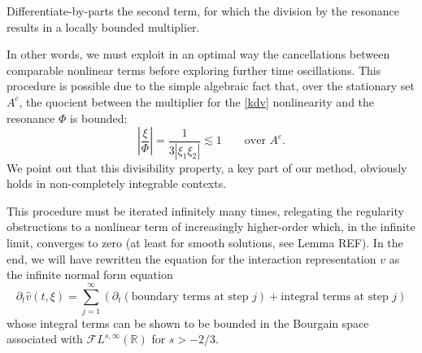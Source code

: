 \documentclass[%
11pt,  reqno]{amsart}
\newcommand{\red}{\color{red}}
\newcommand{\5}{\textup{V}}
\newcommand{\noi}{\noindent}
\newcommand{\dt}{\partial_t}
\theoremstyle{remark}
\newtheorem{remark}[theorem]{Remark}
\newcommand{\R}{\mathbb{R}}
\numberwithin{equation}{section}
\numberwithin{theorem}{section}
\begin{document}
    \smallskip
\noi{\bf Step 3.}  
    Differentiate-by-parts the second term, for which the division by the resonance results in a locally bounded multiplier. 
    
    \medskip
    In other words, we must exploit in an optimal way the cancellations between comparable nonlinear terms before exploring further time oscillations. This procedure is possible due to the simple algebraic fact that, over the stationary set $A^c$, the quocient between the multiplier for the \eqref{kdv} nonlinearity and the resonance $\Phi$ is bounded:
		$$
		\left|\frac{\xi}{\Phi}\right|=\frac{1}{3|\xi_1\xi_2|}\lesssim 1\qquad \mbox{over }A^c.
		$$
		We point out that this divisibility property, a key part of our method, obviously holds in non-completely integrable contexts.
	
	
	

    \medskip

This procedure must be iterated infinitely many times, relegating the regularity obstructions to a nonlinear term of increasingly higher-order which, in the infinite limit, converges to zero (at least for smooth solutions, see Lemma {\red REF}).
    In the end, we will have rewritten the equation for the interaction representation $v$ as the infinite normal form equation
\begin{equation}\label{eq:nfe_intro}
		\dt\widehat{v}(t,\xi)=  \sum_{j=1}^\infty \left(\dt\left(\mbox{boundary terms at step } j\right)+ \mbox{integral terms at step }j\right)
	\end{equation}
	whose integral terms can be shown to be bounded in the Bourgain space associated with $\mathcal{F}L^{s,\infty}(\R)$ for $s>-2/3$. 
\end{document}
